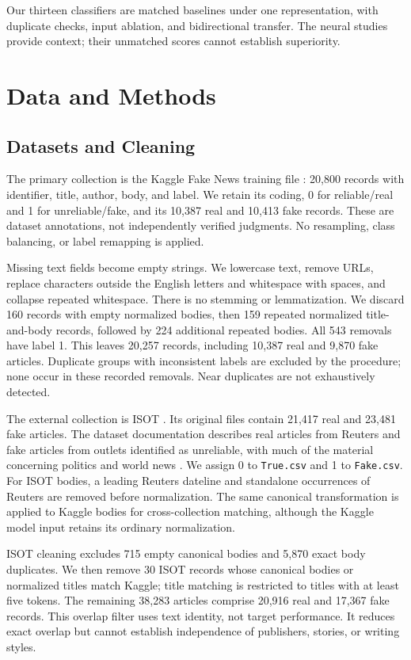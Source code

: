 \documentclass[conference]{IEEEtran}
\begin{document}
Our thirteen classifiers are matched baselines under one representation, with duplicate checks, input ablation, and bidirectional transfer. The neural studies provide context; their unmatched scores cannot establish superiority.

\section{Data and Methods}
\subsection{Datasets and Cleaning}
The primary collection is the Kaggle Fake News training file \cite{kaggle}: 20,800 records with identifier, title, author, body, and label. We retain its coding, 0 for reliable/real and 1 for unreliable/fake, and its 10,387 real and 10,413 fake records. These are dataset annotations, not independently verified judgments. No resampling, class balancing, or label remapping is applied.

Missing text fields become empty strings. We lowercase text, remove URLs, replace characters outside the English letters and whitespace with spaces, and collapse repeated whitespace. There is no stemming or lemmatization. We discard 160 records with empty normalized bodies, then 159 repeated normalized title-and-body records, followed by 224 additional repeated bodies. All 543 removals have label 1. This leaves 20,257 records, including 10,387 real and 9,870 fake articles. Duplicate groups with inconsistent labels are excluded by the procedure; none occur in these recorded removals. Near duplicates are not exhaustively detected.

The external collection is ISOT \cite{isot,ahmed}. Its original files contain 21,417 real and 23,481 fake articles. The dataset documentation describes real articles from Reuters and fake articles from outlets identified as unreliable, with much of the material concerning politics and world news \cite{isot}. We assign 0 to \texttt{True.csv} and 1 to \texttt{Fake.csv}. For ISOT bodies, a leading Reuters dateline and standalone occurrences of Reuters are removed before normalization. The same canonical transformation is applied to Kaggle bodies for cross-collection matching, although the Kaggle model input retains its ordinary normalization.

ISOT cleaning excludes 715 empty canonical bodies and 5,870 exact body duplicates. We then remove 30 ISOT records whose canonical bodies or normalized titles match Kaggle; title matching is restricted to titles with at least five tokens. The remaining 38,283 articles comprise 20,916 real and 17,367 fake records. This overlap filter uses text identity, not target performance. It reduces exact overlap but cannot establish independence of publishers, stories, or writing styles.
\end{document}
